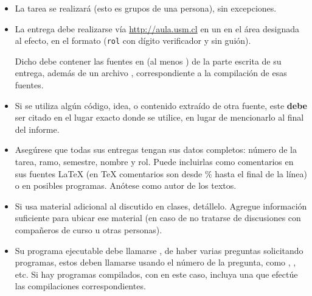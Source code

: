   \begin{itemize}
  \item
    La tarea se realizará 
    (esto es grupos de una persona),
    sin excepciones.
  \item
    La entrega debe realizarse vía \url{http://aula.usm.cl}
    en un  en el área designada al efecto,
    en el formato 
    (\texttt{rol} con dígito verificador y sin guión).

    Dicho  debe contener las fuentes en \LaTeXe{}
    (al menos )
    de la parte escrita de su entrega,
    además de un archivo ,
    correspondiente a la compilación de esas fuentes.
  \item Si se utiliza algún código, idea, o contenido extraído de otra fuente, este \textbf{debe} ser citado en el lugar exacto donde se utilice, en lugar de mencionarlo al final del informe. 
  \item
    Asegúrese que todas sus entregas tengan sus datos completos:
    número de la tarea, ramo, semestre, nombre y rol.
    Puede incluirlas como comentarios en sus fuentes \LaTeX{}
    (en \TeX{} comentarios son desde \% hasta el final de la línea)
    o en posibles programas.
    Anótese como autor de los textos.
 
  \item
    Si usa material adicional al discutido en clases,
    detállelo.
    Agregue información suficiente para ubicar ese material
    (en caso de no tratarse de discusiones con compañeros de curso
     u otras personas).
\ifprograms
  \item
    Su programa ejecutable debe llamarse ,
    de haber varias preguntas solicitando programas,
    estos deben llamarse usando el número de la pregunta,
    como ,
    ,
    etc.
    Si hay programas compilados, con en este caso,
    incluya una 
    que efectúe las compilaciones correspondientes.


\end{itemize}
